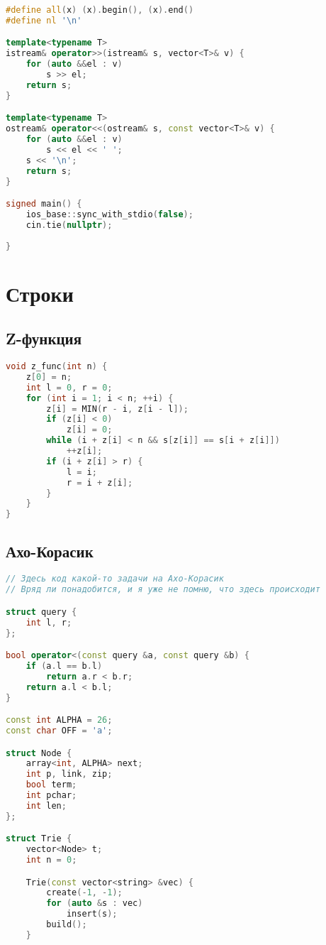 \documentclass[10pt,a4paper,landscape,twosided]{extarticle}
\begin{document}
\begin{multicols}{3}
\begin{lstlisting}[language=C++]
#define all(x) (x).begin(), (x).end()
#define nl '\n'

template<typename T>
istream& operator>>(istream& s, vector<T>& v) {
    for (auto &&el : v)
        s >> el;
    return s;
}

template<typename T>
ostream& operator<<(ostream& s, const vector<T>& v) {
    for (auto &&el : v)
        s << el << ' ';
    s << '\n';
    return s;
}

signed main() {
    ios_base::sync_with_stdio(false);
    cin.tie(nullptr);
  
}
\end{lstlisting}

\section{Строки}

\subsection{Z-функция}
\begin{lstlisting}[language=C++]
void z_func(int n) {
    z[0] = n;
    int l = 0, r = 0;
    for (int i = 1; i < n; ++i) {
        z[i] = MIN(r - i, z[i - l]);
        if (z[i] < 0)
            z[i] = 0;
        while (i + z[i] < n && s[z[i]] == s[i + z[i]])
            ++z[i];
        if (i + z[i] > r) {
            l = i;
            r = i + z[i];
        }
    }
}
\end{lstlisting}

\subsection{Ахо-Корасик}
\begin{lstlisting}[language=C++]
// Здесь код какой-то задачи на Ахо-Корасик
// Вряд ли понадобится, и я уже не помню, что здесь происходит

struct query {
    int l, r;
};

bool operator<(const query &a, const query &b) {
    if (a.l == b.l)
        return a.r < b.r;
    return a.l < b.l;
}

const int ALPHA = 26;
const char OFF = 'a';

struct Node {
    array<int, ALPHA> next;
    int p, link, zip;
    bool term;
    int pchar;
    int len;
};

struct Trie {
    vector<Node> t;
    int n = 0;

    Trie(const vector<string> &vec) {
        create(-1, -1);
        for (auto &s : vec)
            insert(s);
        build();
    }


\end{lstlisting}
\end{multicols}
\end{document}

